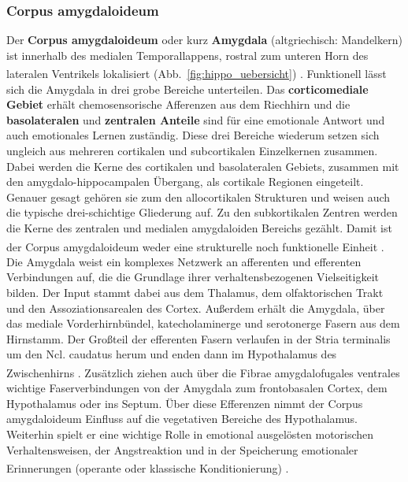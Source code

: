 \documentclass[12pt,a4paper,pdftex]{article}
\begin{document}
\subsubsection*{Corpus amygdaloideum}  
Der \textbf{Corpus amygdaloideum} oder kurz \textbf{Amygdala} (altgriechisch: Mandelkern) ist innerhalb des medialen Temporallappens, rostral zum unteren Horn des lateralen Ventrikels lokalisiert (Abb.~\ref{fig:hippo_uebersicht}) \textsuperscript{\cite[9]{trepel2011neuroanatomie}}. Funktionell lässt sich die Amygdala in drei grobe Bereiche unterteilen. Das \textbf{corticomediale Gebiet} erhält chemosensorische Afferenzen aus dem Riechhirn und die \textbf{basolateralen} und \textbf{zentralen Anteile} sind für eine emotionale Antwort und auch emotionales Lernen zuständig. Diese drei Bereiche wiederum setzen sich ungleich aus mehreren cortikalen und subcortikalen Einzelkernen zusammen. Dabei werden die Kerne des cortikalen und basolateralen Gebiets, zusammen mit den amygdalo-hippocampalen Übergang, als cortikale Regionen eingeteilt. Genauer gesagt gehören sie zum den allocortikalen Strukturen und weisen auch die typische drei-schichtige Gliederung auf. Zu den subkortikalen Zentren werden die Kerne des zentralen und medialen amygdaloiden Bereichs gezählt. Damit ist der Corpus amygdaloideum weder eine strukturelle noch funktionelle Einheit \textsuperscript{\cite[18]{paxinos2014rat}}. \\
Die Amygdala weist ein komplexes Netzwerk an afferenten und efferenten Verbindungen auf, die die Grundlage ihrer verhaltensbezogenen Vielseitigkeit bilden. Der Input stammt dabei aus dem Thalamus, dem olfaktorischen Trakt und den Assoziationsarealen des Cortex. Außerdem erhält die Amygdala, über das mediale Vorderhirnbündel, katecholaminerge und serotonerge Fasern aus dem Hirnstamm. 
Der Großteil der efferenten Fasern verlaufen in der Stria terminalis um den Ncl. caudatus herum und enden dann im Hypothalamus des Zwischenhirns \textsuperscript{\cite[12]{crossman2014neuroanatomy}}. Zusätzlich ziehen auch über die Fibrae amygdalofugales ventrales wichtige Faserverbindungen von der Amygdala zum frontobasalen Cortex, dem Hypothalamus oder ins Septum. Über diese Efferenzen nimmt der Corpus amygdaloideum Einfluss auf die vegetativen Bereiche des Hypothalamus. Weiterhin spielt er eine wichtige Rolle in emotional ausgelösten motorischen Verhaltensweisen, der Angstreaktion und in der Speicherung emotionaler Erinnerungen (operante oder klassische Konditionierung) \textsuperscript{\cite[9]{trepel2011neuroanatomie}}. 
\end{document}

